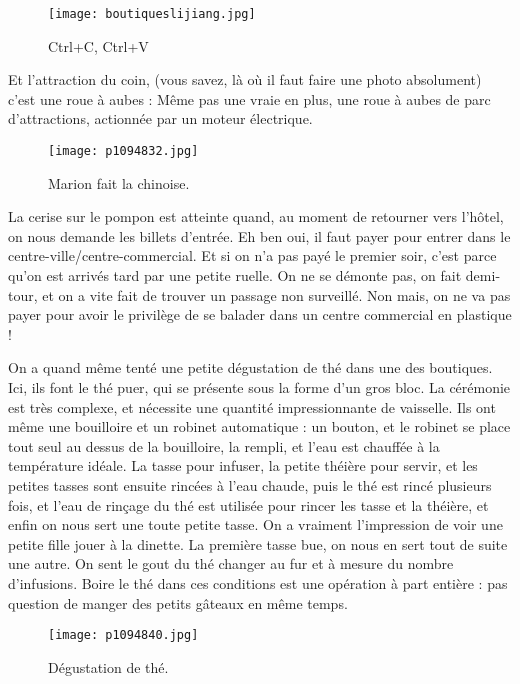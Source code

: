 \documentclass{book}
\begin{document}
\begin{figure}[h]
\centering
\texttt{[image: boutiqueslijiang.jpg]}
\caption*{Ctrl+C, Ctrl+V}
\end{figure}

Et l'attraction du coin, (vous savez, là où il faut faire une photo absolument) c'est une roue à aubes : Même pas une vraie en plus, une roue à aubes de parc d'attractions, actionnée par un moteur électrique.


\begin{figure}[h]
\centering
\texttt{[image: p1094832.jpg]}
\caption*{Marion fait la chinoise.}
\end{figure}

La cerise sur le pompon est atteinte quand, au moment de retourner vers l'hôtel, on nous demande les billets d'entrée. Eh ben oui, il faut payer pour entrer dans le centre-ville/centre-commercial. Et si on n'a pas payé le premier soir, c'est parce qu'on est arrivés tard par une petite ruelle. On ne se démonte pas, on fait demi-tour, et on a vite fait de trouver un passage non surveillé. Non mais, on ne va pas payer pour avoir le privilège de se balader dans un centre commercial en plastique !

On a quand même tenté une petite dégustation de thé dans une des boutiques. Ici, ils font le thé puer, qui se présente sous la forme d'un gros bloc. La cérémonie est très complexe, et nécessite une quantité impressionnante de vaisselle. Ils ont même une bouilloire et un robinet automatique : un bouton, et le robinet se place tout seul au dessus de la bouilloire, la rempli, et l'eau est chauffée à la température idéale. La tasse pour infuser, la petite théière pour servir, et les petites tasses sont ensuite rincées à l'eau chaude, puis le thé est rincé plusieurs fois, et l'eau de rinçage du thé est utilisée pour  rincer les tasse et la théière, et enfin on nous sert une toute petite tasse. On a vraiment l'impression de voir une petite fille jouer à la dinette. La première tasse bue, on nous en sert tout de suite une autre. On sent le gout du thé changer au fur et à mesure du nombre d'infusions. Boire le thé dans ces conditions est une opération à part entière : pas question de manger des petits gâteaux en même temps.


\begin{figure}[h]
\centering
\texttt{[image: p1094840.jpg]}
\caption*{Dégustation de thé.}
\end{figure}
\end{document}

